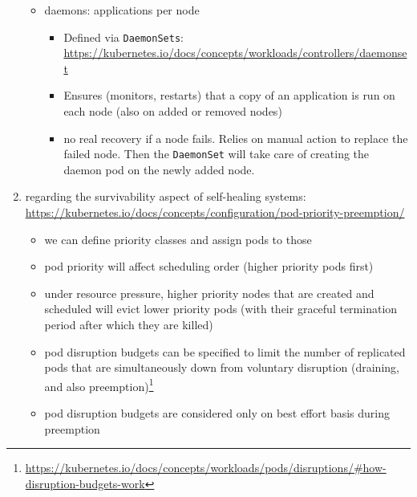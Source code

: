 \begin{enumerate}
\begin{itemize}
            \item daemons: applications per node
              \begin{itemize}
                \item Defined via \texttt{DaemonSets}: \url{https://kubernetes.io/docs/concepts/workloads/controllers/daemonset}
                \item Ensures (monitors, restarts) that a copy of an application is run on each node (also on added or removed nodes)
                \item no real recovery if a node fails. Relies on manual action to replace the failed node. Then the \texttt{DaemonSet} will take care of creating the daemon pod on the newly added node.
              \end{itemize}
          \end{itemize}
    \item regarding the survivability aspect of self-healing systems: \url{https://kubernetes.io/docs/concepts/configuration/pod-priority-preemption/}
      \begin{itemize}
        \item we can define priority classes and assign pods to those
        \item pod priority will affect scheduling order (higher priority pods first)
        \item under resource pressure, higher priority nodes that are created and scheduled will evict lower priority pods (with their graceful termination period after which they are killed)
        \item pod disruption budgets can be specified to limit the number of replicated pods that are simultaneously down from voluntary disruption (draining, and also preemption)\footnote{\url{https://kubernetes.io/docs/concepts/workloads/pods/disruptions/\#how-disruption-budgets-work}}
        \item pod disruption budgets are considered only on best effort basis during preemption
      \end{itemize}
  \end{enumerate}

